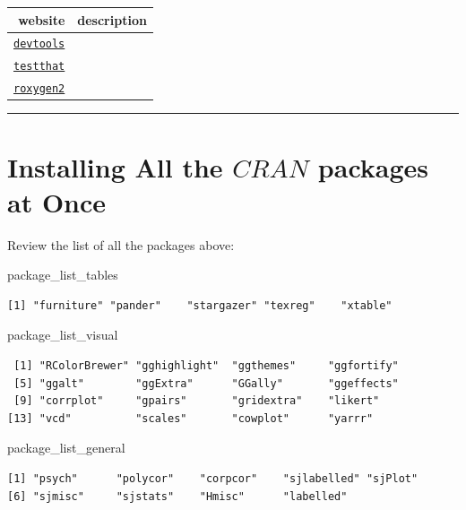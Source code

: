 \documentclass[]{book}
\newenvironment{Shaded}{\begin{snugshade}}{\end{snugshade}}
\newcommand{\NormalTok}[1]{#1}
\theoremstyle{definition}
\theoremstyle{definition}
\theoremstyle{definition}
\theoremstyle{remark}
\begin{document}
\begin{longtable}[]{@{}rl@{}}
\toprule
website & description\tabularnewline
\midrule
\endhead
\href{}{\texttt{devtools}} &\tabularnewline
\href{}{\texttt{testthat}} &\tabularnewline
\href{}{\texttt{roxygen2}} &\tabularnewline
\bottomrule
\end{longtable}

\begin{center}\rule{0.5\linewidth}{\linethickness}\end{center}

\section{\texorpdfstring{Installing All the \(CRAN\) packages at
Once}{Installing All the CRAN packages at Once}}\label{installing-all-the-cran-packages-at-once}

Review the list of all the packages above:

\begin{Shaded}
\begin{Highlighting}[]
\NormalTok{package_list_tables}
\end{Highlighting}
\end{Shaded}

\begin{verbatim}
[1] "furniture" "pander"    "stargazer" "texreg"    "xtable"   
\end{verbatim}

\begin{Shaded}
\begin{Highlighting}[]
\NormalTok{package_list_visual}
\end{Highlighting}
\end{Shaded}

\begin{verbatim}
 [1] "RColorBrewer" "gghighlight"  "ggthemes"     "ggfortify"   
 [5] "ggalt"        "ggExtra"      "GGally"       "ggeffects"   
 [9] "corrplot"     "gpairs"       "gridextra"    "likert"      
[13] "vcd"          "scales"       "cowplot"      "yarrr"       
\end{verbatim}

\begin{Shaded}
\begin{Highlighting}[]
\NormalTok{package_list_general}
\end{Highlighting}
\end{Shaded}

\begin{verbatim}
[1] "psych"      "polycor"    "corpcor"    "sjlabelled" "sjPlot"    
[6] "sjmisc"     "sjstats"    "Hmisc"      "labelled"  
\end{verbatim}
\end{document}
